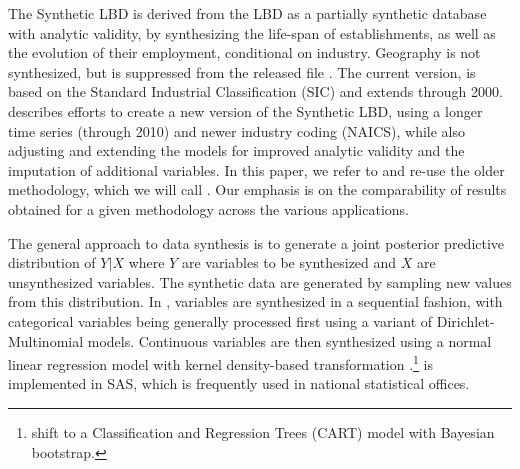 

The Synthetic LBD is derived from the LBD as a partially synthetic database with analytic validity, by synthesizing the life-span of establishments, as well as the evolution of their employment, conditional on industry. Geography is not synthesized, but is suppressed from the released file \citep{RePEc:cen:tnotes:11-01}. The current version, is based on the Standard Industrial Classification (SIC) and extends through 2000. \citet{RePEc:cen:wpaper:14-12} describes efforts to create a new version of the Synthetic LBD, using a longer time  series (through 2010) and newer industry coding (NAICS), while also adjusting and extending the models for  improved  analytic validity and  the imputation of additional variables. In this paper, we refer to and re-use the older methodology, which we will call \SynLBD. Our emphasis is on the comparability of results obtained for a given methodology across the various applications.
  

 The general approach to data synthesis is to generate a joint posterior predictive distribution of $Y|X$ where $Y$ are variables to be synthesized and $X$ are unsynthesized variables. The synthetic data are generated by sampling new values from this distribution. In \SynLBD, variables are synthesized in a sequential fashion, with categorical variables being generally processed first using a variant of Dirichlet-Multinomial models. Continuous variables are then synthesized using a normal linear regression model with kernel density-based transformation \citep{WOODCOCK20094228}.\footnote{\textcite{RePEc:cen:wpaper:14-12} shift  to a Classification and Regression Trees (CART) model with Bayesian bootstrap. } \SynLBD{} is implemented in SAS\texttrademark, which is frequently used in national statistical offices.

